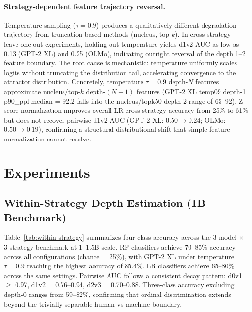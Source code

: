\documentclass[11pt,a4paper]{article}
\begin{document}
\paragraph{Strategy-dependent feature trajectory reversal.}
Temperature sampling ($\tau = 0.9$) produces a qualitatively different degradation trajectory from truncation-based methods (nucleus, top-$k$). In cross-strategy leave-one-out experiments, holding out temperature yields d1v2 AUC as low as 0.13 (GPT-2 XL) and 0.25 (OLMo), indicating outright reversal of the depth 1--2 feature boundary. The root cause is mechanistic: temperature uniformly scales logits without truncating the distribution tail, accelerating convergence to the attractor distribution. Concretely, temperature $\tau = 0.9$ depth-$N$ features approximate nucleus/top-$k$ depth-$(N+1)$ features (GPT-2 XL temp09 depth-1 p90\_ppl median = 92.2 falls into the nucleus/topk50 depth-2 range of 65--92). Z-score normalization improves overall LR cross-strategy accuracy from 25\% to 61\% but does not recover pairwise d1v2 AUC (GPT-2 XL: $0.50 \to 0.24$; OLMo: $0.50 \to 0.19$), confirming a structural distributional shift that simple feature normalization cannot resolve.

\section{Experiments}

\subsection{Within-Strategy Depth Estimation (1B Benchmark)}
\label{sec:within-strategy}

Table~\ref{tab:within-strategy} summarizes four-class accuracy across the 3-model $\times$ 3-strategy benchmark at 1--1.5B scale. RF classifiers achieve 70--85\% accuracy across all configurations (chance = 25\%), with GPT-2 XL under temperature $\tau = 0.9$ reaching the highest accuracy of 85.4\%. LR classifiers achieve 65--80\% across the same settings. Pairwise AUC follows a consistent decay pattern: d0v1 $\geq$ 0.97, d1v2 = 0.76--0.94, d2v3 = 0.70--0.88. Three-class accuracy excluding depth-0 ranges from 59--82\%, confirming that ordinal discrimination extends beyond the trivially separable human-vs-machine boundary.
\end{document}
